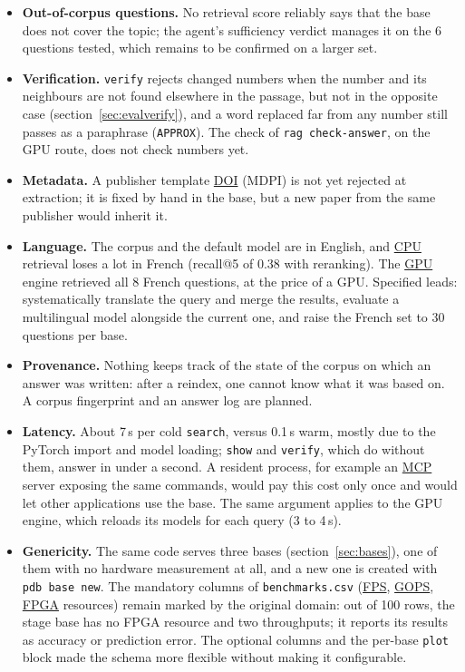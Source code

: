 \documentclass[11pt,a4paper]{article}
\newcommand{\cmd}[1]{\texttt{#1}}
\newcommand{\gl}[2]{\hyperlink{gl:#1}{\textcolor{glcolor}{#2}}}
\begin{document}
\begin{itemize}
    larger sets reviewed by a third party, sets for the drone and stage bases, and the human
    ratings.
  \item \textbf{Out-of-corpus questions.} No retrieval score reliably says that the base does
    not cover the topic; the agent's sufficiency verdict manages it on the 6 questions
    tested, which remains to be confirmed on a larger set.
  \item \textbf{Verification.} \cmd{verify} rejects changed numbers when the number and its
    neighbours are not found elsewhere in the passage, but not in the opposite case
    (section~\ref{sec:evalverify}), and a word replaced far from any number still passes as a
    paraphrase (\cmd{APPROX}). The check of \cmd{rag check-answer}, on the GPU route, does not
    check numbers yet.
  \item \textbf{Metadata.} A publisher template \gl{DOI}{DOI} (MDPI) is not yet rejected at extraction;
    it is fixed by hand in the base, but a new paper from the same publisher would inherit
    it.
  \item \textbf{Language.} The corpus and the default model are in English, and \gl{CPU}{CPU}
    retrieval loses a lot in French (recall@5 of 0.38 with reranking). The \gl{GPU}{GPU} engine
    retrieved all 8 French questions, at the price of a GPU. Specified leads: systematically
    translate the query and merge the results, evaluate a multilingual model alongside the
    current one, and raise the French set to 30 questions per base.
  \item \textbf{Provenance.} Nothing keeps track of the state of the corpus on which an answer
    was written: after a reindex, one cannot know what it was based on. A corpus fingerprint
    and an answer log are planned.
  \item \textbf{Latency.} About 7\,s per cold \cmd{search}, versus 0.1\,s warm, mostly due
    to the PyTorch import and model loading; \cmd{show} and \cmd{verify}, which do without
    them, answer in under a second. A resident process, for example an \gl{MCP}{MCP} server exposing
    the same commands, would pay this cost only once and would let other applications use
    the base. The same argument applies to the GPU engine, which reloads its models for
    each query (3 to 4\,s).
  \item \textbf{Genericity.} The same code serves three bases (section~\ref{sec:bases}), one of
    them with no hardware measurement at all, and a new one is created with \cmd{pdb base new}.
    The mandatory columns of \cmd{benchmarks.csv} (\gl{FPS}{FPS}, \gl{GOPS}{GOPS}, \gl{FPGA}{FPGA} resources) remain
    marked by the original domain: out of 100 rows, the stage base has no FPGA resource and
    two throughputs; it reports its results as accuracy or prediction error. The optional
    columns and the per-base \cmd{plot} block made the schema more flexible without making it
    configurable.
\end{itemize}
\end{document}
